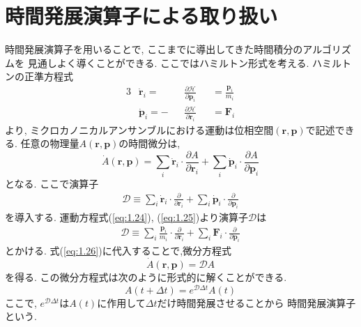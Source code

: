 \section{時間発展演算子による取り扱い}
時間発展演算子を用いることで, ここまでに導出してきた時間積分のアルゴリズムを
見通しよく導くことができる.
ここではハミルトン形式を考える.
ハミルトンの正準方程式
\begin{alignat}{3}
 &\dot{\bm{r}}_{i}
   = && \frac{\partial \mathcal{H}}{\partial \bm{p}_{i}}
 &&= \frac{\bm{p}_{i}}{m_{i}}
 \label{eq:1.24}
 \\
 &\dot{\bm{p}}_{i}
   = - && \frac{\partial \mathcal{H}}{\partial \bm{r}_{i}}
 &&= \bm{F}_{i}
 \label{eq:1.25}
\end{alignat}
より, ミクロカノニカルアンサンブルにおける運動は位相空間$(\bm{r}, \bm{p})$で記述できる. 
任意の物理量$A(\bm{r}, \bm{p})$の時間微分は,
\begin{equation}
 \dot{A}(\bm{r}, \bm{p})
  = \sum_{i} \dot{\bm{r}}_{i} \cdot \frac{\partial A}{\partial \bm{r}_{i}}
  + \sum_{i} \dot{\bm{p}}_{i} \cdot \frac{\partial A}{\partial \bm{p}_{i}}
 \label{eq:1.26}
\end{equation}
となる. ここで演算子
\begin{align}
 \mathcal{D} \equiv
      \sum_{i} \dot{\bm{r}}_{i} \cdot \frac{\partial}{\partial \bm{r}_{i}}
    + \sum_{i} \dot{\bm{p}}_{i} \cdot \frac{\partial}{\partial \bm{p}_{i}}
 \label{eq:1.27}
\end{align}
を導入する. 運動方程式(\ref{eq:1.24}), (\ref{eq:1.25})より演算子$\mathcal{D}$は
\begin{align}
 \mathcal{D} \equiv
    \sum_{i} \frac{\bm{p}_{i}}{m_{i}}
    \cdot \frac{\partial}{\partial \bm{r}_{i}}
  + \sum_{i} \bm{F}_{i} \cdot \frac{\partial}{\partial \bm{p}_{i}}
 \label{eq:1.27}
\end{align}
とかける. 式(\ref{eq:1.26})に代入することで,微分方程式
\begin{equation}
 \dot{A}(\bm{r}, \bm{p}) = \mathcal{D}A
 \label{eq:1.28}
\end{equation}
を得る. この微分方程式は次のように形式的に解くことができる. 
\begin{equation}
 A(t + \Delta t ) = e^{\mathcal{D} \Delta t} A(t)
 \label{eq:1.29}
\end{equation}
ここで, $e^{\mathcal{D} \Delta t}$は$A(t)$に作用して$\Delta t$だけ時間発展させることから
時間発展演算子という. 

